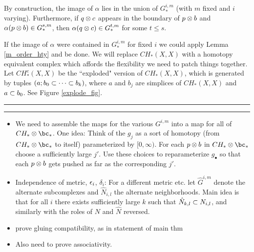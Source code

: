 By construction, the image of $\alpha$ lies in the union of $G^{i,m}_*$ 
(with $m$ fixed and $i$ varying).
Furthermore, if $q\otimes c$ 
appears in the boundary of $p\otimes b$ and $\alpha(p\otimes b) \in G^{s,m}_*$, then
$\alpha(q\otimes c) \in G^{t,m}_*$ for some $t \le s$.

If the image of $\alpha$ were contained in $G^{i,m}_*$ for fixed $i$ we could apply 
Lemma \ref{m_order_hty} and be done.
We will replace $CH_*(X, X)$ with a homotopy equivalent complex which affords the flexibility
we need to patch things together.
Let $CH^e_*(X, X)$ be the ``exploded" version of $CH_*(X, X)$, which is generated by
tuples $(a; b_0 \subset \cdots\subset b_k)$, where $a$ and $b_j$ are simplices of $CH_*(X, X)$
and $a\subset b_0$.
See Figure \ref{explode_fig}.







\medskip\hrule\medskip\hrule\medskip


\begin{itemize}
\item We need to assemble the maps for the various $G^{i,m}$ into
a map for all of $CH_*\ot \bc_*$.
One idea: Think of the $g_j$ as a sort of homotopy (from $CH_*\ot \bc_*$ to itself) 
parameterized by $[0,\infty)$.  For each $p\otimes b$ in $CH_*\ot \bc_*$ choose a sufficiently
large $j'$.  Use these choices to reparameterize $g_\bullet$ so that each
$p\otimes b$ gets pushed as far as the corresponding $j'$.
\item Independence of metric, $\epsilon_i$, $\delta_i$:
For a different metric etc. let $\hat{G}^{i,m}$ denote the alternate subcomplexes
and $\hat{N}_{i,l}$ the alternate neighborhoods.
Main idea is that for all $i$ there exists sufficiently large $k$ such that
$\hat{N}_{k,l} \subset N_{i,l}$, and similarly with the roles of $N$ and $\hat{N}$ reversed.
\item prove gluing compatibility, as in statement of main thm
\item Also need to prove associativity.
\end{itemize}



\noop{

\begin{lemma}

\end{lemma}

\begin{proof}

\end{proof}

}









